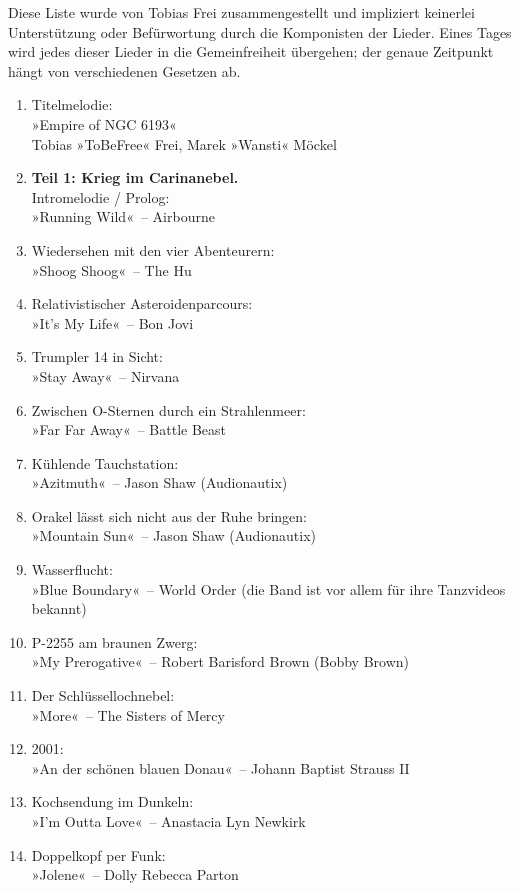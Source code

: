 Diese Liste wurde von Tobias Frei zusammengestellt und impliziert keinerlei Unterstützung oder Befürwortung durch die Komponisten der Lieder. Eines Tages wird jedes dieser Lieder in die Gemeinfreiheit übergehen; der genaue Zeitpunkt hängt von verschiedenen Gesetzen ab.

\begin{enumerate}
    \item Titelmelodie:\\ »Empire of NGC 6193«\\ Tobias »ToBeFree« Frei, Marek »Wansti« Möckel
    \item \textbf{Teil 1: Krieg im Carinanebel.}\\ Intromelodie / Prolog:\\ »Running Wild«~– Airbourne
    \item Wiedersehen mit den vier Abenteurern:\\ »Shoog Shoog«~– The Hu
    \item Relativistischer Asteroidenparcours:\\ »It’s My Life«~– Bon Jovi
    \item Trumpler 14 in Sicht:\\ »Stay Away«~– Nirvana
    \item Zwischen O-Sternen durch ein Strahlenmeer:\\ »Far Far Away«~– Battle Beast
    \item Kühlende Tauchstation:\\ »Azitmuth«~– Jason Shaw (Audionautix)
    \item Orakel lässt sich nicht aus der Ruhe bringen:\\ »Mountain Sun«~– Jason Shaw (Audionautix)
    \item Wasserflucht:\\ »Blue Boundary«~– World Order (die Band ist vor allem für ihre Tanzvideos bekannt)
    \item P-2255 am braunen Zwerg:\\ »My Prerogative«~– Robert Barisford Brown (Bobby Brown)
    \item Der Schlüssellochnebel:\\ »More«~– The Sisters of Mercy
    \item 2001:\\ »An der schönen blauen Donau«~– Johann Baptist Strauss II
    \item Kochsendung im Dunkeln:\\ »I’m Outta Love«~– Anastacia Lyn Newkirk
    \item Doppelkopf per Funk:\\ »Jolene«~– Dolly Rebecca Parton

\end{enumerate}
